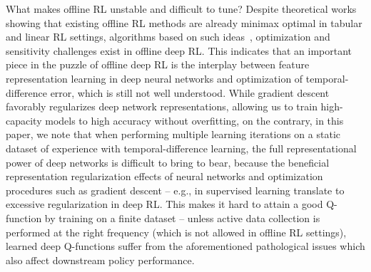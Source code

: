 What makes offline RL unstable and difficult to tune? Despite theoretical works~\citep{jin2020pessimism} showing that existing offline RL methods are already minimax optimal
in tabular and linear RL settings, algorithms based on such ideas~\citep{agarwal2019optimistic,brac,kumar2020conservative}, optimization and sensitivity challenges exist in offline deep RL. This indicates that an important piece in the puzzle of offline deep RL is the interplay between feature representation learning in deep neural networks and optimization of temporal-difference error, which is still not well understood.
While gradient descent favorably regularizes deep network representations, allowing us to train high-capacity models to high accuracy without overfitting, on the contrary, in this paper, we note that when performing multiple learning iterations on a static dataset of experience with temporal-difference learning, the full representational power of deep networks is difficult to bring to bear, because the beneficial representation regularization effects of neural networks and optimization procedures such as gradient descent -- e.g., in supervised learning translate to excessive regularization in deep RL. This makes it hard to attain a good Q-function by training on a finite dataset -- unless active data collection is performed at the right frequency (which is not allowed in offline RL settings), learned deep Q-functions suffer from the aforementioned pathological issues which also affect downstream policy performance. 
\fi
% 
